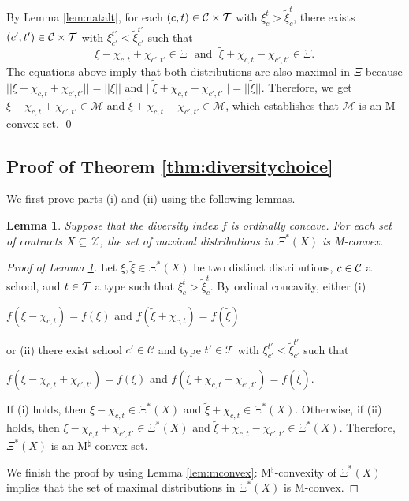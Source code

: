\documentclass[12pt]{amsart}
\newtheorem{lemma}{Lemma}
\theoremstyle{remark}
\def\oconcave{ordinally concave} %
\newcommand{\norm}[1]{|| #1 ||}
\begin{document}
By Lemma \ref{lem:natalt}, for each
$(c,t) \in \mathcal{C} \times \mathcal{T}$ with $\xi_c^t>\tilde{\xi}_c^t$, there exists
$(c',t') \in \mathcal{C} \times \mathcal{T}$ with  $\xi_{c'}^{t'}<\tilde{\xi}_{c'}^{t'}$ such that
\[\xi-\chi_{c,t}+\chi_{c',t'}\in \Xi \; \mbox{ and } \; \tilde{\xi}+\chi_{c,t}-\chi_{c',t'} \in \Xi.\]
The equations above imply
that both distributions are also maximal in $\Xi$ because
$\norm{\xi-\chi_{c,t}+\chi_{c',t'}}=\norm{\xi}$ and
$\norm{\tilde{\xi}+\chi_{c,t}-\chi_{c',t'}}=\norm{\tilde \xi}$. Therefore, we
get $\xi-\chi_{c,t}+\chi_{c',t'}\in \mathcal{M}$ and
$\tilde{\xi}+\chi_{c,t}-\chi_{c',t'} \in \mathcal{M}$, which establishes that $\mathcal{M}$
is an M-convex set.
\qed

\bigskip




\subsection*{Proof of Theorem \ref{thm:diversitychoice}}
We first prove parts (i) and (ii) using the following lemmas.

\begin{lemma}\label{lem:pareto}
Suppose that the diversity index $f$ is \oconcave{}.
For each set of contracts $X\subseteq \mathcal{X}$, the set of maximal distributions in $\Xi^*(X)$ is M-convex.
\end{lemma}

\begin{proof}[Proof of Lemma \ref{lem:pareto}]\renewcommand{\qedsymbol}{$\blacksquare$}
Let $\xi,\tilde \xi \in \Xi^*(X)$ be two distinct distributions, $c \in \mathcal{C}$ a school,
and $t \in \mathcal{T}$ a type such that $\xi_c^t>\tilde{\xi}_c^t$.
By ordinal concavity, %
either (i)
\begin{center}
$f(\xi-\chi_{c,t})=f(\xi)$ and $f(\tilde{\xi}+\chi_{c,t})=f(\tilde{\xi})$
\end{center}
or (ii) there exist school $c'\in \mathcal{C}$ and type $t'\in \mathcal{T}$ with $\xi_{c'}^{t'}<\tilde{\xi}_{c'}^{t'}$ such that
  \begin{center}
$f(\xi-\chi_{c,t}+\chi_{c',t'})=f(\xi)$ and $f(\tilde{\xi}+\chi_{c,t}-\chi_{c',t'}) = f(\tilde{\xi})$.
  \end{center}
If (i) holds, then $\xi-\chi_{c,t} \in \Xi^*(X)$ and $\tilde{\xi}+\chi_{c,t} \in \Xi^*(X)$.
Otherwise, if (ii) holds, then $\xi-\chi_{c,t}+\chi_{c',t'} \in \Xi^*(X)$ and $\tilde{\xi}+\chi_{c,t}-\chi_{c',t'} \in \Xi^*(X)$. Therefore, $\Xi^*(X)$ is an M$^{\natural}$-convex set.

We finish the proof by using Lemma \ref{lem:mconvex}:
M$^{\natural}$-convexity of $\Xi^*(X)$ implies that the set of maximal distributions
in $\Xi^*(X)$ is M-convex.
\end{proof}
\end{document}
